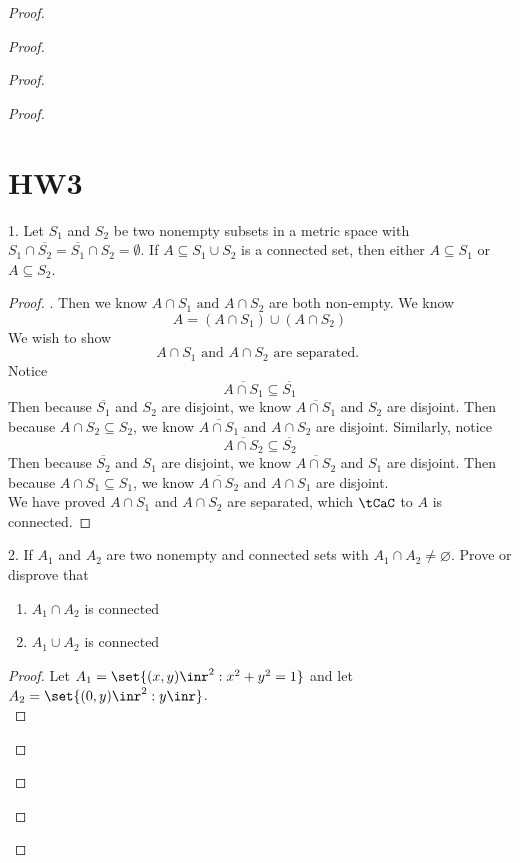 \documentclass{report}
\begin{document}
\begin{proof}
\begin{proof}
\begin{proof}
\begin{proof}
\section{HW3}
\begin{question}{}{}
1. Let $S_1$ and $S_2$ be two nonempty subsets in a metric space with $S_1 \cap \overline{S_2} = \overline{S_1}\cap S_2 = \emptyset$. If $A \subseteq S_1 \cup S_2$ is a connected set, then either $A \subseteq S_1$ or $A \subseteq S_2$.
\end{question}
\begin{proof}
. Then we know $A\cap S_1\text{ and }A\cap S_2$ are both non-empty. We know
\begin{equation}
A=(A\cap S_1)\cup (A\cap S_2)
\end{equation}
We wish to show
 \begin{equation}
A\cap S_1\text{ and }A\cap S_2\text{ are separated. }
\end{equation}
Notice 
\begin{equation}
\overline{A\cap S_1}\subseteq \overline{S_1}
\end{equation}
Then because $\overline{S_1}$ and $S_2$ are disjoint, we know $\overline{A\cap S_1}$ and $S_2$ are disjoint. Then because $A\cap S_2\subseteq S_2$, we know $\overline{A\cap S_1}$ and $A\cap S_2$ are disjoint. Similarly, notice
\begin{equation}
\overline{A\cap S_2}\subseteq \overline{S_2}
\end{equation}
Then because $\overline{S_2}$ and $S_1$ are disjoint, we know $\overline{A\cap S_2}$ and $S_1$ are disjoint. Then because $A\cap S_1\subseteq S_1$, we know $\overline{A\cap S_2}$ and $A\cap S_1$ are disjoint.    \\

We have proved $A\cap S_1$ and $A\cap S_2$ are separated, which $\tCaC$ to $A$ is connected.
\end{proof}
\begin{question}{}{}
2. If $A_1$ and $A_2$ are two nonempty and connected sets with $A_1\cap A_2\neq \varnothing$. Prove or disprove that
\begin{enumerate}[label=(\alph*)]
  \item $A_1\cap A_2$ is connected
  \item $A_1\cup A_2$ is connected
\end{enumerate}
\end{question}
\begin{proof}
Let $A_1=\set{(x,y)\inr^2:x^2+y^2=1}$ and let  $A_2=\set{(0,y)\inr^2:y\inr}$.\\


\end{proof}
\end{proof}
\end{proof}
\end{proof}
\end{proof}
\end{document}
